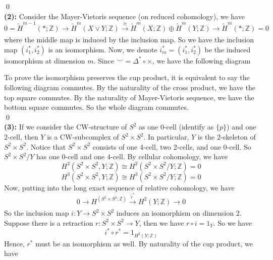 \documentclass[12pt]{amsart}
\newcommand{\Z}{\mathbb{Z}}
\begin{document}
\qed\\
\textbf{(2):} Consider the Mayer-Vietoris sequence (on reduced cohomology), we have
\[0=\tilde{H}^{m-1}(\ast;\Z)\to \tilde{H}^{m}(X\vee Y;\Z)\xrightarrow[]{\cong} \tilde{H}^{m}(X;\Z)\oplus \tilde{H}^{m}(Y;\Z)\to \tilde{H}^{m}(\ast;\Z)=0\]
where the middle map is induced by the inclusion map. So we have the inclusion map $(i_1^\ast,i_2^\ast)$ is an isomorphism. Now, we denote $i^{\ast}_m=(i_1^\ast,i_2^\ast)$ be the induced isomorphism at dimension $m$. Since $\smile=\Delta^\ast \circ \times$, we have the following diagram
\begin{center}
\end{center}
To prove the isomorphism preserves the cup product, it is equivalent to say the following diagram commutes. By the naturality of the cross product, we have the top square commutes.
By the naturality of Mayer-Vietoris sequence, we have the bottom square commutes. So the whole diagram commutes.
\\\qed\\
\textbf{(3):} If we consider the CW-structure of $S^2$ as one 0-cell (identify as $\{p\}$) and one 2-cell, then $Y$ is a CW-subcomplex of $S^2\times S^2$. In particular, $Y$ is the 2-skeleton of $S^2\times S^2$. Notice that $S^2\times S^2$ consists of one 4-cell, two 2-cells, and one 0-cell. So $S^2\times S^2/Y$ has one 0-cell and one 4-cell. By cellular cohomology, we have
\[H^2(S^2\times S^2,Y;\Z)\cong H^2(S^2\times S^2/Y;\Z)=0\]
\[H^3(S^2\times S^2,Y;\Z)\cong H^3(S^2\times S^2/Y;\Z)=0\]
Now, putting into the long exact sequence of relative cohomology, we have
\[0\to H^(S^2\times S^2;\Z )\xrightarrow[]{i^\ast}H^2(Y;\Z)\to 0\]
So the inclusion map $i:Y\to S^2\times S^2$ induces an isomorphism on dimension 2. Suppose there is a retraction $r:S^2\times S^2\to Y$, then we have $r\circ i =1_Y$. So we have
\[ i^\ast \circ r^\ast=1_{H^2(Y;\Z)}\]
Hence, $r^\ast$ must be an isomorphism as well. By naturality of the cup product, we have
\end{document}
